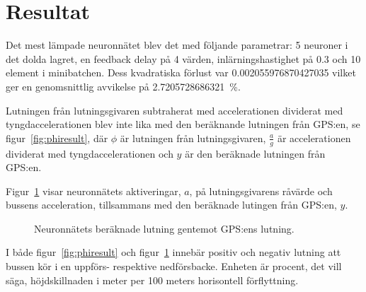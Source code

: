 \section{Resultat}
Det mest lämpade neuronnätet blev det med följande parametrar:
\SI{5}{\styck} neuroner i det dolda lagret, en feedback delay på \SI{4}{\styck} värden,
inlärningshastighet på \num{0.3} och \SI{10}{\styck} element i minibatchen.
Dess kvadratiska förlust var \num[round-precision=3]{0.002055976870427035}
vilket ger en genomsnittlig avvikelse på
\SI[round-precision=3]{2.7205728686321}{\percent}.

Lutningen från lutningsgivaren subtraherat med accelerationen dividerat med tyngdaccelerationen
blev inte lika med den beräknande lutningen från GPS:en, se figur~\ref{fig:phiresult},
där $\phi$ är lutningen från lutningsgivaren,
$\frac{a}{g}$ är accelerationen dividerat med tyngdaccelerationen
och $y$ är den beräknade lutningen från GPS:en.

Figur~\ref{fig:netresult} visar neuronnätets aktiveringar, $a$, på
lutningsgivarens råvärde och bussens acceleration,
tillsammans med den beräknade lutingen från GPS:en, $y$.

\begin{figure}
	\centering
	\caption{Neuronnätets beräknade lutning gentemot GPS:ens lutning. \label{fig:netresult}}
\end{figure}

I både figur~\ref{fig:phiresult} och figur~\ref{fig:netresult} innebär
positiv och negativ lutning att bussen kör i en uppförs- respektive nedförsbacke.
Enheten är procent, det vill säga,
höjdskillnaden i meter per 100 meters horisontell förflyttning.

